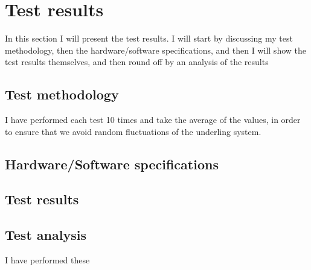 \section{Test results}
\label{section:test_results}
In this section I will present the test results. I will start by discussing my test methodology, then the hardware/software specifications, and then I will show the test results themselves, and then round off by an analysis of the results 

\subsection{Test methodology}
I have performed each test 10 times and take the average of the values, in order to ensure that we avoid random fluctuations of the underling system.

\subsection{Hardware/Software specifications}

\subsection{Test results}

\subsection{Test analysis}


I have performed these


\subsection{}
\label{section:test_results_spanners}
